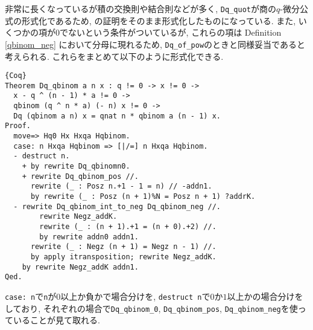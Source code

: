 \documentclass[11pt]{jsreport}
\theoremstyle{mystyle}
\newcommand{\0}{\textbf{0}}
\newcommand{\1}{\textbf{1}}
\newcommand{\2}{\textbf{2}}
\begin{document}
非常に長くなっているが積の交換則や結合則などが多く, {\tt Dq\_quot}が商の$q$-微分公式の形式化であるため, \cite{Kac}の証明をそのまま形式化したものになっている. また, いくつかの項が$0$でないという条件がついているが, これらの項は Definition \ref{qbinom_neg} において分母に現れるため, {\tt Dq\_of\_pow}のときと同様妥当であると考えられる. これらをまとめて以下のように形式化できる. 
\begin{lstlisting}{Coq}
Theorem Dq_qbinom a n x : q != 0 -> x != 0 ->
  x - q ^ (n - 1) * a != 0 ->
  qbinom (q ^ n * a) (- n) x != 0 ->
  Dq (qbinom a n) x = qnat n * qbinom a (n - 1) x.
Proof.
  move=> Hq0 Hx Hxqa Hqbinom.
  case: n Hxqa Hqbinom => [|/=] n Hxqa Hqbinom.
  - destruct n.
    + by rewrite Dq_qbinomn0.
    + rewrite Dq_qbinom_pos //.
      rewrite (_ : Posz n.+1 - 1 = n) // -addn1.
      by rewrite (_ : Posz (n + 1)%N = Posz n + 1) ?addrK.
  - rewrite Dq_qbinom_int_to_neg Dq_qbinom_neg //.
        rewrite Negz_addK.
        rewrite (_ : (n + 1).+1 = (n + 0).+2) //.
        by rewrite addn0 addn1.
      rewrite (_ : Negz (n + 1) = Negz n - 1) //.
      by apply itransposition; rewrite Negz_addK.
    by rewrite Negz_addK addn1.
Qed.
\end{lstlisting}
{\tt case:\,n}で{\tt n}が$0$以上か負かで場合分けを, {\tt destruct n}で$0$か$1$以上かの場合分けをしており, それぞれの場合で{\tt Dq\_qbinom\_0}, {\tt Dq\_qbinom\_pos}, {\tt Dq\_qbinom\_neg}を使っていることが見て取れる. 
\end{document}
